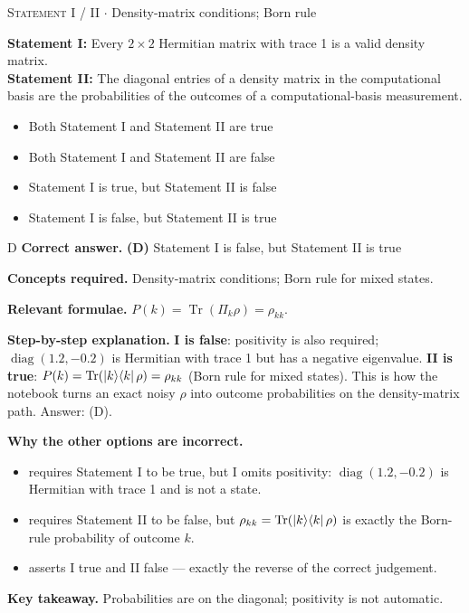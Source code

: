 \documentclass[11pt,a4paper]{article}
\newcommand{\optlabel}[1]{\textbf{(#1)}}
\newcommand{\correctlabel}[1]{\textcolor{okgreen}{\textbf{(#1)}\,\ding{51}}}
\newenvironment{qitem}[1]{\begin{list}{}{\setlength{\leftmargin}{3.3em}\setlength{\labelwidth}{3.1em}%
  \setlength{\labelsep}{0.2em}\setlength{\topsep}{3pt}\setlength{\parsep}{3pt}}\item[\textbf{Q.#1}\hfill]}{\end{list}}
\newcommand{\qsep}{\par\vspace{2pt}{\color{black!15}\hrule}\vspace{4pt}}
\newcommand{\qmeta}[2]{{\footnotesize\color{black!60}\textsc{#1} \;$\cdot$\; #2}\par}
\begin{document}
\begin{qitem}{18}
\qmeta{Statement I / II}{Density-matrix conditions; Born rule}
\textbf{Statement I:} Every $2\times2$ Hermitian matrix with trace 1 is a valid density matrix.\\[1mm]
\textbf{Statement II:} The diagonal entries of a density matrix in the computational basis are the probabilities of the outcomes of a
computational-basis measurement.
\begin{itemize}[leftmargin=2.6em, labelsep=0.4em, itemsep=2pt, topsep=3pt]
\item[\optlabel{A}] Both Statement I and Statement II are true
\item[\optlabel{B}] Both Statement I and Statement II are false
\item[\optlabel{C}] Statement I is true, but Statement II is false
\item[\correctlabel{D}] Statement I is false, but Statement II is true
\end{itemize}
\end{qitem}
\begin{solbox}{D}
\textbf{\color{brand}Correct answer.} \textcolor{okgreen}{\textbf{(D)}} Statement I is false, but Statement II is true

\textbf{\color{brand}Concepts required.} Density-matrix conditions; Born rule for mixed states.

\textbf{\color{brand}Relevant formulae.} $P(k) = \operatorname{Tr}(\Pi_k\rho) = \rho_{kk}$.

\textbf{\color{brand}Step-by-step explanation.} \textbf{I is false}: positivity is also required; $\operatorname{diag}(1.2, -0.2)$ is Hermitian with trace 1 but has a negative eigenvalue.
\textbf{II is true}: $P(k) = \operatorname{Tr}(\ket k\!\bra k\rho) = \rho_{kk}$ (Born rule for mixed states). This is how the notebook turns an exact noisy
$\rho$ into outcome probabilities on the density-matrix path. Answer: (D).

\textbf{\color{brand}Why the other options are incorrect.}
\begin{itemize}[leftmargin=2.4em, itemsep=1pt, topsep=2pt]
\item[\textbf{(A)}] requires Statement I to be true, but I omits positivity: $\operatorname{diag}(1.2, -0.2)$ is Hermitian with trace 1 and is not a state.
\item[\textbf{(B)}] requires Statement II to be false, but $\rho_{kk} = \operatorname{Tr}(\ket k\!\bra k\rho)$ is exactly the Born-rule probability of outcome $k$.
\item[\textbf{(C)}] asserts I true and II false --- exactly the reverse of the correct judgement.
\end{itemize}
\textbf{\color{brand}Key takeaway.} Probabilities are on the diagonal; positivity is not automatic.
\end{solbox}
\qsep
\end{document}
